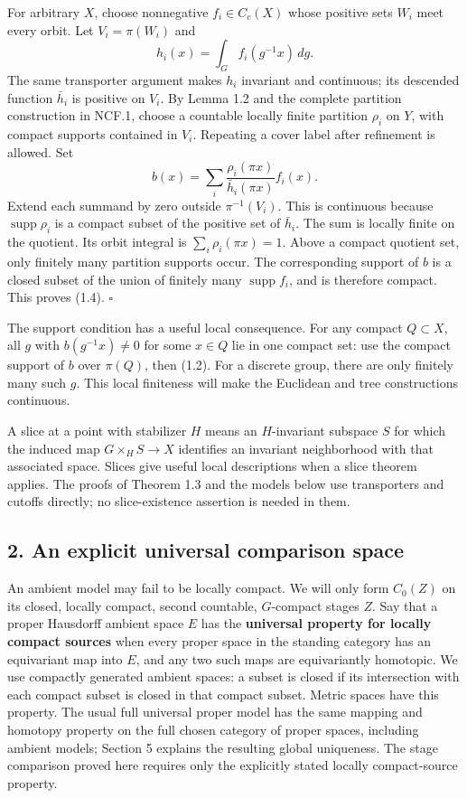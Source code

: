 \documentclass[
  11pt,
]{article}
\begin{document}
For arbitrary \(X\), choose nonnegative \(f_i\in C_c(X)\) whose positive
sets \(W_i\) meet every orbit. Let \(V_i=\pi(W_i)\) and \[
 h_i(x)=\int_G f_i(g^{-1}x)\,dg.
\] The same transporter argument makes \(h_i\) invariant and continuous;
its descended function \(\bar h_i\) is positive on \(V_i\). By Lemma 1.2
and the complete partition construction in NCF.1, choose a countable
locally finite partition \(\rho_i\) on \(Y\), with compact supports
contained in \(V_i\). Repeating a cover label after refinement is
allowed. Set \[
       b(x)=\sum_i\frac{\rho_i(\pi x)}{\bar h_i(\pi x)}f_i(x).
 \tag{1.6}
\] Extend each summand by zero outside \(\pi^{-1}(V_i)\). This is
continuous because \(\operatorname{supp}\rho_i\) is a compact subset of
the positive set of \(\bar h_i\). The sum is locally finite on the
quotient. Its orbit integral is \(\sum_i\rho_i(\pi x)=1\). Above a
compact quotient set, only finitely many partition supports occur. The
corresponding support of \(b\) is a closed subset of the union of
finitely many \(\operatorname{supp}f_i\), and is therefore compact. This
proves (1.4). \(\square\)

The support condition has a useful local consequence. For any compact
\(Q\subset X\), all \(g\) with \(b(g^{-1}x)\ne0\) for some \(x\in Q\)
lie in one compact set: use the compact support of \(b\) over
\(\pi(Q)\), then (1.2). For a discrete group, there are only finitely
many such \(g\). This local finiteness will make the Euclidean and tree
constructions continuous.

A slice at a point with stabilizer \(H\) means an \(H\)-invariant
subspace \(S\) for which the induced map \(G\times_H S\to X\) identifies
an invariant neighborhood with that associated space. Slices give useful
local descriptions when a slice theorem applies. The proofs of Theorem
1.3 and the models below use transporters and cutoffs directly; no
slice-existence assertion is needed in them.

\subsection{2. An explicit universal comparison
space}\label{an-explicit-universal-comparison-space}

An ambient model may fail to be locally compact. We will only form
\(C_0(Z)\) on its closed, locally compact, second countable,
\(G\)-compact stages \(Z\). Say that a proper Hausdorff ambient space
\(E\) has the \textbf{universal property for locally compact sources}
when every proper space in the standing category has an equivariant map
into \(E\), and any two such maps are equivariantly homotopic. We use
compactly generated ambient spaces: a subset is closed if its
intersection with each compact subset is closed in that compact subset.
Metric spaces have this property. The usual full universal proper model
has the same mapping and homotopy property on the full chosen category
of proper spaces, including ambient models; Section 5 explains the
resulting global uniqueness. The stage comparison proved here requires
only the explicitly stated locally compact-source property.
\end{document}
